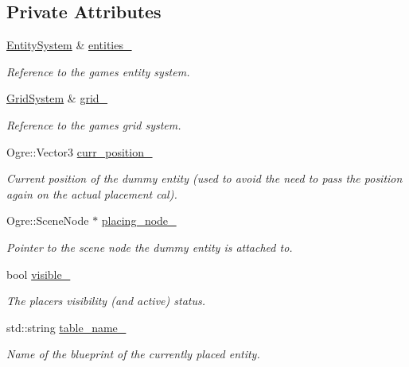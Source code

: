 \subsection*{Private Attributes}
\begin{DoxyCompactItemize}
\item 
\hyperlink{class_entity_system}{Entity\+System} \& \hyperlink{class_entity_placer_ae9fd5bc815ebbfd3edaeda50c3514db6}{entities\+\_\+}
\begin{DoxyCompactList}\small\item\em Reference to the game\textquotesingle{}s entity system. \end{DoxyCompactList}\item 
\hyperlink{class_grid_system}{Grid\+System} \& \hyperlink{class_entity_placer_ab83d8094255391c2ad998dad77420510}{grid\+\_\+}
\begin{DoxyCompactList}\small\item\em Reference to the game\textquotesingle{}s grid system. \end{DoxyCompactList}\item 
Ogre\+::\+Vector3 \hyperlink{class_entity_placer_a27b04e112365310f41af57bc764fc595}{curr\+\_\+position\+\_\+}
\begin{DoxyCompactList}\small\item\em Current position of the dummy entity (used to avoid the need to pass the position again on the actual placement cal). \end{DoxyCompactList}\item 
Ogre\+::\+Scene\+Node $\ast$ \hyperlink{class_entity_placer_a6e7d6a22bb82c701ef9a1be971de9205}{placing\+\_\+node\+\_\+}
\begin{DoxyCompactList}\small\item\em Pointer to the scene node the dummy entity is attached to. \end{DoxyCompactList}\item 
bool \hyperlink{class_entity_placer_ad54b47813b660f962dcd04378ebf3ecd}{visible\+\_\+}
\begin{DoxyCompactList}\small\item\em The placer\textquotesingle{}s visibility (and active) status. \end{DoxyCompactList}\item 
std\+::string \hyperlink{class_entity_placer_a51c07b2b7a1a2e66334fd961aea2bff4}{table\+\_\+name\+\_\+}
\begin{DoxyCompactList}\small\item\em Name of the blueprint of the currently placed entity. \end{DoxyCompactList}\item 

\end{DoxyCompactItemize}
